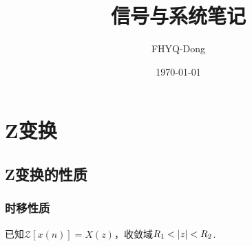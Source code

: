 \documentclass[device=normal, lang=cn]{elegantbook}
\title{信号与系统笔记}
\author{FHYQ-Dong}
\date{\today}
\numberwithin{equation}{section}
\begin{document}
\maketitle
\frontmatter

\tableofcontents
\mainmatter


\chapter{Z变换}

\section{Z变换的性质}

\subsection{时移性质}
已知$\mathcal{Z}[x(n)] = X(z)$，收敛域$R_1 < \abs{z} < R_2$.
\end{document}
